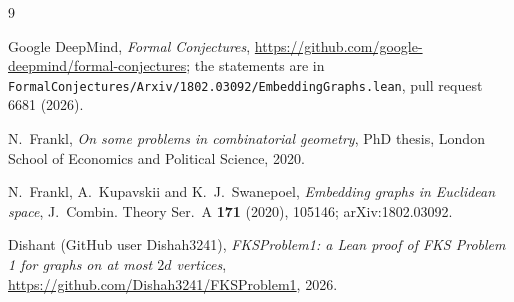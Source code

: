 \documentclass[11pt]{amsart}
\theoremstyle{definition}
\theoremstyle{remark}
\begin{document}
\begin{thebibliography}{9}

Google DeepMind, \emph{Formal Conjectures}, \url{https://github.com/google-deepmind/formal-conjectures}; the statements are in \texttt{FormalConjectures/Arxiv/1802.03092/EmbeddingGraphs.lean}, pull request 6681 (2026).

N.~Frankl, \emph{On some problems in combinatorial geometry}, PhD thesis, London School of Economics and Political Science, 2020.

N.~Frankl, A.~Kupavskii and K.~J.~Swanepoel, \emph{Embedding graphs in Euclidean space}, J.~Combin. Theory Ser.~A \textbf{171} (2020), 105146; arXiv:1802.03092.

Dishant (GitHub user Dishah3241), \emph{FKSProblem1: a Lean proof of FKS Problem 1 for graphs on at most $2d$ vertices}, \url{https://github.com/Dishah3241/FKSProblem1}, 2026.

\end{thebibliography}
\end{document}
